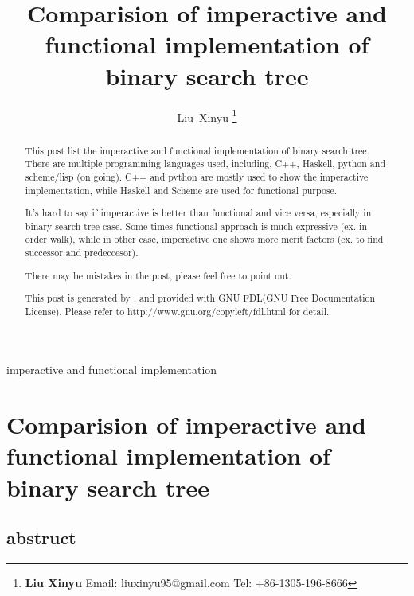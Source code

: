 \documentclass{article}
\begin{document}
\fi


\title{Comparision of imperactive and functional implementation of binary search tree}

\author{Liu~Xinyu
\thanks{{\bfseries Liu Xinyu } \newline
  Email: liuxinyu95@gmail.com \newline
  Tel:   +86-1305-196-8666 \newline}
  }

{imperactive and functional implementation}

\maketitle

\ifx\wholebook\relax
\chapter{Comparision of imperactive and functional implementation of binary search tree}

\section{abstruct}
\else
\begin{abstract}
\fi
This post list the imperactive and functional implementation of binary search tree. There are
multiple programming languages used, including, C++, Haskell, python and scheme/lisp (on going).
C++ and python are mostly used to show the imperactive implementation, while Haskell and Scheme are
used for functional purpose.

It's hard to say if imperactive is better than functional and vice versa, especially in binary search
tree case. Some times functional approach is much expressive (ex. in order walk), while in other case, 
imperactive one shows more merit factors (ex. to find successor and predeccesor).

There may be mistakes in the post, please feel free to point out.

This post is generated by \LaTeXe, and provided with GNU FDL(GNU Free Documentation License).
Please refer to http://www.gnu.org/copyleft/fdl.html for detail.

\ifx\wholebook\relax\else
\end{abstract}
\fi
\end{document}
